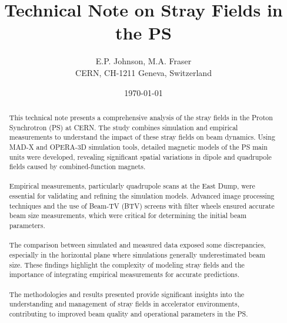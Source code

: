 \documentclass{cernatsnote}
\title{Technical Note on Stray Fields in the PS}
\author{
	E.P. Johnson, M.A. Fraser\; \\		
	CERN, CH-1211 Geneva, Switzerland
}
\date{\today}
\begin{document}
\maketitle

\begin{abstract}
This technical note presents a comprehensive analysis of the stray fields in the Proton Synchrotron (PS) at CERN. The study combines simulation and empirical measurements to understand the impact of these stray fields on beam dynamics. Using MAD-X and OPERA-3D simulation tools, detailed magnetic models of the PS main units were developed, revealing significant spatial variations in dipole and quadrupole fields caused by combined-function magnets.
\\
\\
Empirical measurements, particularly quadrupole scans at the East Dump, were essential for validating and refining the simulation models. Advanced image processing techniques and the use of Beam-TV (BTV) screens with filter wheels ensured accurate beam size measurements, which were critical for determining the initial beam parameters.
\\
\\
The comparison between simulated and measured data exposed some discrepancies, especially in the horizontal plane where simulations generally underestimated beam size. These findings highlight the complexity of modeling stray fields and the importance of integrating empirical measurements for accurate predictions.
\\
\\
The methodologies and results presented provide significant insights into the understanding and management of stray fields in accelerator environments, contributing to improved beam quality and operational parameters in the PS.

\end{abstract}
\\ \\ \\ 
\newpage

\begingroup
\color{black}
\tableofcontents
\endgroup

\pagebreak




\end{document}
